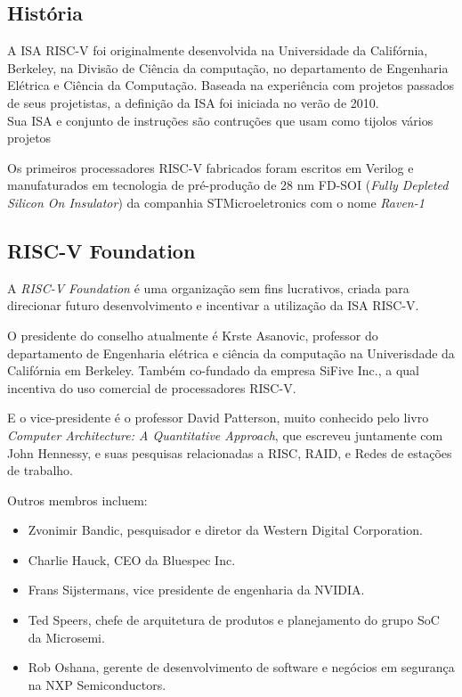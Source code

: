 	\subsection{História}%
		A ISA RISC-V foi originalmente desenvolvida na Universidade da Califórnia, Berkeley, na Divisão de Ciência da computação, no departamento de Engenharia Elétrica e Ciência da Computação. Baseada na experiência com projetos passados de seus projetistas, a definição da ISA foi iniciada no verão de 2010.\\

		Sua ISA e conjunto de instruções são contruções que usam como tijolos vários projetos  

		Os primeiros processadores RISC-V fabricados foram escritos em Verilog e manufaturados em tecnologia de pré-produção de 28 nm FD-SOI (\textit{Fully Depleted Silicon On Insulator}) da companhia STMicroeletronics com o nome \textit{Raven-1}



	

	\subsection{RISC-V Foundation}
		
		A \textit{RISC-V Foundation} é uma organização sem fins lucrativos, criada para direcionar futuro desenvolvimento e incentivar a utilização da ISA RISC-V.\ ~\cite{riscv_foundation} 

		O presidente do conselho atualmente é Krste Asanovic, professor do departamento de Engenharia elétrica e ciência da computação na Univerisdade da Califórnia em Berkeley. Também co-fundado da empresa SiFive Inc., a qual incentiva do uso comercial de processadores RISC-V.\

		E o vice-presidente é o professor David Patterson, muito conhecido pelo livro \textit{Computer Architecture: A Quantitative Approach}, que escreveu juntamente com John Hennessy, e suas pesquisas relacionadas a RISC, RAID, e Redes de estações de trabalho.\

		Outros membros incluem:\
		\begin{itemize}  
			\item Zvonimir Bandic, pesquisador e diretor da Western Digital Corporation. 
			\item Charlie Hauck, CEO da Bluespec Inc.
			\item Frans Sijstermans, vice presidente de engenharia da NVIDIA.
			\item Ted Speers, chefe de arquitetura de produtos e planejamento do grupo SoC da Microsemi.
			\item Rob Oshana, gerente de desenvolvimento de software e negócios em segurança na NXP Semiconductors. 
		\end{itemize}

